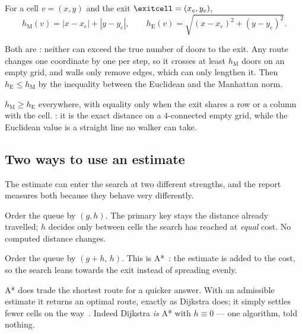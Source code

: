\begin{definition}[Estimates]
For a cell $v=(x,y)$ and the exit $\exitcell=(x_e,y_e)$,
\[
  h_{\mathrm{M}}(v)=|x-x_e|+|y-y_e|,
  \qquad
  h_{\mathrm{E}}(v)=\sqrt{(x-x_e)^2+(y-y_e)^2}.
\]
\end{definition}

Both are : neither can exceed the true number of doors to
the exit. Any route changes one coordinate by one per step, so it crosses at
least $h_{\mathrm{M}}$ doors on an empty grid, and walls only remove edges,
which can only lengthen it. Then $h_{\mathrm{E}}\le h_{\mathrm{M}}$ by the
inequality between the Euclidean and the Manhattan norm.

\begin{keypoint}
$h_{\mathrm{M}}\ge h_{\mathrm{E}}$ everywhere, with equality only when the exit
shares a row or a column with the cell. : it is the exact distance on a $4$-connected empty grid, while the
Euclidean value is a straight line no walker can take.
\end{keypoint}

\subsection{Two ways to use an estimate}

The estimate can enter the search at two different strengths, and the report
measures both because they behave very differently.

\begin{description}[leftmargin=*,style=nextline,itemsep=6pt]
  \item[As a tie-break.] Order the queue by $(g,h)$. The primary key stays the
    distance already travelled; $h$ decides only between cells the search has
    reached at \emph{equal} cost. No computed distance changes.
  \item[As a priority.] Order the queue by $(g+h,\,h)$. This is
    A*~\cite{hart1968formal}: the estimate is added to the cost, so the search
    leans towards the exit instead of spreading evenly.
\end{description}

\begin{keypoint}
A* does  trade the shortest route for a quicker answer. With an
admissible estimate it returns an optimal route, exactly as Dijkstra does; it
simply settles fewer cells on the way~\cite{hart1968formal}. Indeed Dijkstra
\emph{is} A* with $h\equiv0$ --- one algorithm, told nothing.
\end{keypoint}

